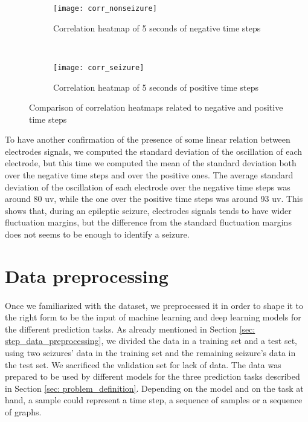 \begin{figure}[htbp]
    \centering
    \begin{subfigure}[t]{0.49\textwidth}
		\texttt{[image: corr\_nonseizure]}
        \caption{Correlation heatmap of 5 seconds of negative time steps}
        \label{fig:corr_nonseizure}
	\end{subfigure}%
	~
	\begin{subfigure}[t]{0.49\textwidth}
		\texttt{[image: corr\_seizure]}
        \caption{Correlation heatmap of 5 seconds of positive time steps}
        \label{fig:corr_seizure}
    \end{subfigure}
    \caption{Comparison of correlation heatmaps related to negative and positive time steps}
    \label{fig:corr_heatmaps}
\end{figure}

To have another confirmation of the presence of some linear relation between electrodes signals, we computed the standard deviation of the oscillation of each electrode, but this time we computed the mean of the standard deviation both over the negative time steps and over the positive ones. The average standard deviation of the oscillation of each electrode over the negative time steps was around 80 \acs{uv}, while the one over the positive time steps was around 93 \acs{uv}. This shows that, during an epileptic seizure, electrodes signals tends to have wider fluctuation margins, but the difference from the standard fluctuation margins does not seems to be enough to identify a seizure.


\section{Data preprocessing} \label{sec: data_preprocessing}
\paragraph{} Once we familiarized with the dataset, we preprocessed it in order to shape it to the right form to be the input of machine learning and deep learning models for the different prediction tasks. As already mentioned in Section \ref{sec: step_data_preprocessing}, we divided the data in a training set and a test set, using two seizures' data in the training set and the remaining seizure's data in the test set. We sacrificed the validation set for lack of data. The data was prepared to be used by different models for the three prediction tasks described in Section \ref{sec: problem_definition}. Depending on the model and on the task at hand, a sample could represent a time step, a sequence of samples or a sequence of graphs.

